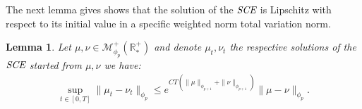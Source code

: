 \documentclass[11pt,a4paper]{article}
\newcommand{\RRP}{\mathbb{R}^+_*}
\newcommand{\MC}{\mathcal{M}}
\newcommand{\SCE}{\emph{SCE}}
\newcommand{\brac}[1]{\left\langle#1\right\rangle}
\newcommand{\dd}{\mathop{}\!\mathrm{d}}
\newtheorem{lemma}[theorem]{Lemma}
\newtheorem{proposition}[theorem]{Proposition}
\begin{document}
The next lemma gives shows that the solution of the $\SCE$ is Lipschitz with respect to its initial value in a specific weighted norm total variation norm.
\begin{lemma}\label{lem:Lip-smol-TV}
    Let $\mu,\nu \in \MC^+_{\phi_p}(\RRP)$ and denote $\mu_t,\nu_t$ the respective solutions of the $\SCE$ started from $\mu,\nu$ we have:
    \begin{align*}
        \sup\limits_{t \in [0,T]}\| \mu_t - \nu_t\|_{\phi_p} \leq e^{CT\left(\|\mu\|_{\phi_{p+1}} + \|\nu\|_{\phi_{p+1}}\right)}\|\mu- \nu\|_{\phi_p}.
    \end{align*}
\end{lemma}
\end{document}
